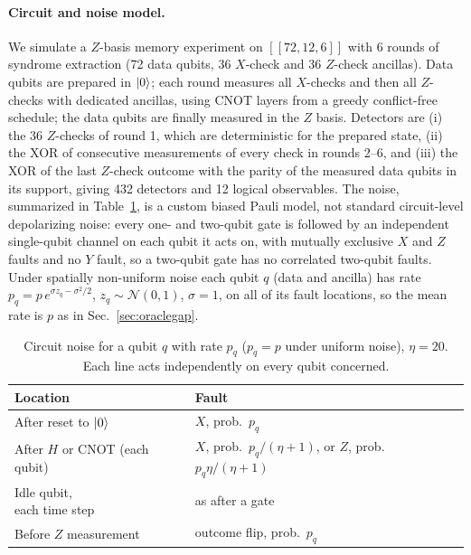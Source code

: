 \documentclass[a4paper,twocolumn,11pt,nopdfoutputerror]{quantumarticle}
\newcommand{\code}[3]{\ensuremath{[\![#1,#2,#3]\!]}}
\begin{document}
\paragraph{Circuit and noise model.} We simulate a $Z$-basis memory
experiment on $\code{72}{12}{6}$ with 6 rounds of syndrome extraction
(72 data qubits, 36 $X$-check and 36 $Z$-check ancillas). Data qubits are
prepared in $\ket{0}$; each round measures all $X$-checks and then all
$Z$-checks with dedicated ancillas, using CNOT layers from a greedy
conflict-free schedule; the data qubits are finally measured in the $Z$
basis. Detectors are (i) the 36 $Z$-checks of round 1, which are
deterministic for the prepared state, (ii) the XOR of consecutive
measurements of every check in rounds 2--6, and (iii) the XOR of the last
$Z$-check outcome with the parity of the measured data qubits in its
support, giving 432 detectors and 12 logical observables. The noise,
summarized in Table~\ref{tab:circuitnoise}, is a custom biased Pauli
model, not standard circuit-level depolarizing noise: every one- and
two-qubit gate is followed by an independent single-qubit channel on each
qubit it acts on, with mutually exclusive $X$ and $Z$ faults and no $Y$
fault, so a two-qubit gate has no correlated two-qubit faults. Under
spatially non-uniform noise each qubit $q$ (data and ancilla) has rate
$p_q=p\,e^{\sigma z_q-\sigma^2/2}$, $z_q\sim\mathcal N(0,1)$, $\sigma=1$,
on all of its fault locations, so the mean rate is $p$ as in
Sec.~\ref{sec:oraclegap}.

\begin{table}[t]
\centering
\caption{Circuit noise for a qubit $q$ with rate $p_q$ ($p_q=p$ under
         uniform noise), $\eta=20$. Each line acts independently on
         every qubit concerned.}
\label{tab:circuitnoise}
\footnotesize
\setlength{\tabcolsep}{3pt}
\begin{tabular}{@{}ll@{}}
\toprule
Location & Fault \\
\midrule
After reset to $\ket{0}$ & $X$, prob.\ $p_q$ \\
\makecell[l]{After $H$ or CNOT\\(each qubit)} & \makecell[l]{$X$, prob.\ $p_q/(\eta+1)$, or\\$Z$, prob.\ $p_q\eta/(\eta+1)$} \\
\makecell[l]{Idle qubit,\\each time step} & as after a gate \\
Before $Z$ measurement & outcome flip, prob.\ $p_q$ \\
\bottomrule
\end{tabular}
\end{table}
\end{document}
